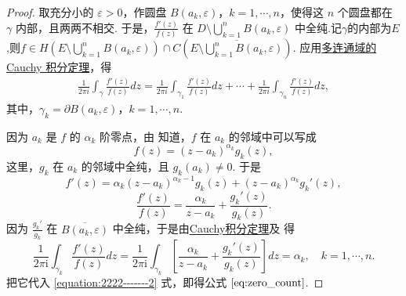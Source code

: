 \documentclass[../../main.tex]{subfiles}
\begin{document}
\begin{proof} 
取充分小的 \( \varepsilon > 0 \)，作圆盘 \( B(a_k, \varepsilon) \)，\( k = 1, \cdots, n \)，使得这 \( n \) 个圆盘都在 \( \gamma \) 内部，且两两不相交. 于是，\( \frac{f'(z)}{f(z)} \) 在 \( D \setminus \bigcup_{k=1}^{n} B(a_k, \varepsilon) \) 中全纯.记$\gamma$的内部为$E$,则$f\in H(E\setminus \bigcup_{k=1}^{n} B(a_k, \varepsilon))\cap C(\overline{E\setminus \bigcup_{k=1}^{n} B(a_k, \varepsilon)})$. 应用\hyperref[theorem:定理3.2.5]{多连通域的 Cauchy 积分定理}，得
\begin{align}
\frac{1}{2\pi i} \int_{\gamma} \frac{f'(z)}{f(z)} dz = \frac{1}{2\pi i} \int_{\gamma_1} \frac{f'(z)}{f(z)} dz + \cdots + \frac{1}{2\pi i} \int_{\gamma_n} \frac{f'(z)}{f(z)} dz, \label{equation:2222-------2}
\end{align}
其中，\( \gamma_k = \partial B(a_k, \varepsilon) \)，\( k = 1, \cdots, n \).

因为 \( a_k \) 是 \( f \) 的 \( \alpha_k \) 阶零点，由 知道，\( f \) 在 \( a_k \) 的邻域中可以写成
\[
f(z) = (z - a_k)^{\alpha_k} g_k(z),
\]
这里，\( g_k \) 在 \( a_k \) 的邻域中全纯，且 \( g_k(a_k) \neq 0 \). 于是
\[
f'(z) = \alpha_k (z - a_k)^{\alpha_k - 1} g_k(z) + (z - a_k)^{\alpha_k} g_k'(z),
\]
\[
\frac{f'(z)}{f(z)} = \frac{\alpha_k}{z - a_k} + \frac{g_k'(z)}{g_k(z)}.
\]
因为 \( \frac{g_k'}{g_k} \) 在 \( \overline{B(a_k, \varepsilon)} \) 中全纯，于是由\hyperref[theorem:Cauchy-Goursat定理(Cauchy积分定理)]{Cauchy积分定理}及 得
\[
\frac{1}{2\pi \mathrm{i}}\int_{\gamma _k}{\frac{f' (z)}{f(z)}dz}=\frac{1}{2\pi \mathrm{i}}\int_{\gamma _k}{\left[ \frac{\alpha _k}{z-a_k}+\frac{g_k' (z)}{g_k(z)} \right] dz}=\alpha _k,\quad k=1,\cdots ,n.
\]
把它代入 \eqref{equation:2222-------2} 式，即得公式 \(\eqref{eq:zero_count}\).
\end{proof}
\end{document}
